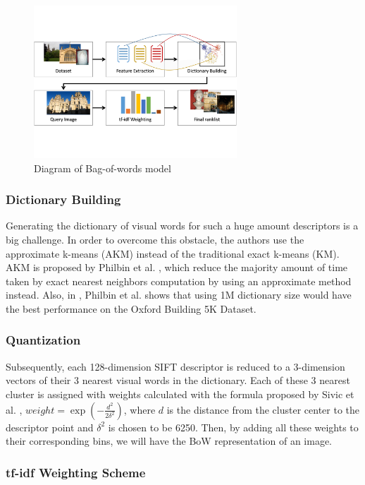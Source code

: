 \documentclass[10pt,conference,]{IEEEtran}
\begin{document}
\begin{figure}
    \centering
    \includegraphics[width=3.0in]{process.pdf}
    \caption{Diagram of Bag-of-words model}
    \label{fig:bow_model}
\end{figure}

\subsubsection{Dictionary Building} \label{section:dictionary_building}

Generating the dictionary of visual words for such a huge amount descriptors is a big challenge. In order to overcome this obstacle, the authors use the approximate k-means (AKM) instead of the traditional exact k-means (KM). AKM is proposed by Philbin et al. \cite{2}, which reduce the majority amount of time taken by exact nearest neighbors computation by using an approximate method instead. Also, in \cite{2}, Philbin et al. shows that using 1M dictionary size would have the best performance on the Oxford Building 5K Dataset.

\subsubsection{Quantization} \label{section:quantization}

Subsequently, each 128-dimension SIFT descriptor is reduced to a 3-dimension vectors of their 3 nearest visual words in the dictionary. Each of these 3 nearest cluster is assigned with weights calculated with the formula proposed by Sivic et al. \cite{7}, $weight = \exp(-\frac{d^2}{2\delta^2})$, where $d$ is the distance from the cluster center to the descriptor point and $\delta^2$ is chosen to be 6250. Then, by adding all these weights to their corresponding bins, we will have the BoW representation of an image.

\subsubsection{tf-idf Weighting Scheme} \label{section:tfidf_weighting}
\end{document}
